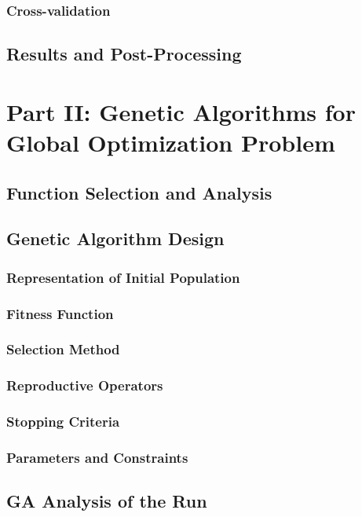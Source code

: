 \documentclass[conference]{inc/IEEEtran}
\begin{document}
\subsubsection{Cross-validation}

\subsection{Results and Post-Processing}

\section{Part II: Genetic Algorithms for Global Optimization Problem}

\subsection{Function Selection and Analysis}
\subsection{Genetic Algorithm Design}

\subsubsection{Representation of Initial Population}

\subsubsection{Fitness Function}

\subsubsection{Selection Method}

\subsubsection{Reproductive Operators}

\subsubsection{Stopping Criteria}

\subsubsection{Parameters and Constraints}
\subsection{GA Analysis of the Run}
\end{document}
